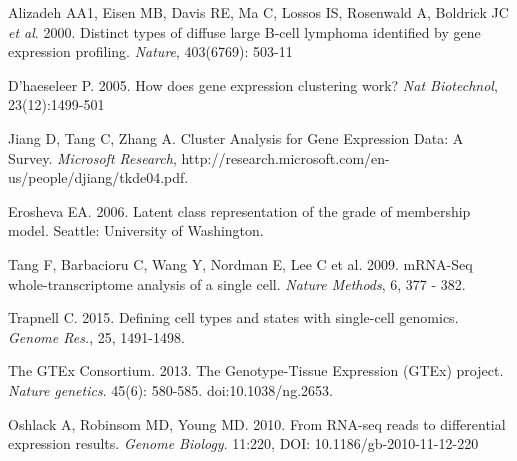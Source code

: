 \documentclass[10pt,letterpaper]{article}
\begin{document}
\begin{thebibliography}{9}
Alizadeh AA1, Eisen MB, Davis RE, Ma C, Lossos IS, Rosenwald A, Boldrick JC \textit{et al}. 2000.
Distinct types of diffuse large B-cell lymphoma identified by gene expression profiling.
\textit{Nature}, 403(6769):  503-11

D'haeseleer P. 2005.
How does gene expression clustering work?
\textit{Nat Biotechnol}, 23(12):1499-501

Jiang D, Tang C, Zhang A.
Cluster Analysis for Gene Expression Data: A Survey.
\textit{Microsoft Research}, http://research.microsoft.com/en-us/people/djiang/tkde04.pdf.

Erosheva EA. 2006.
Latent class representation of the grade of membership model.
Seattle: University of Washington.

Tang F,  Barbacioru C,  Wang Y,  Nordman E,  Lee C  et al. 2009.
mRNA-Seq whole-transcriptome analysis of a single cell.
\textit{Nature Methods}, 6, 377 - 382.

Trapnell C. 2015.
Defining cell types and states with single-cell genomics.
\textit{Genome Res.},  25, 1491-1498.




The GTEx Consortium. 2013.
The Genotype-Tissue Expression (GTEx) project.
\textit{Nature genetics}. 45(6): 580-585. doi:10.1038/ng.2653.

Oshlack A, Robinsom MD, Young MD. 2010.
From RNA-seq reads to differential expression results.
\textit{Genome Biology}. 11:220, DOI: 10.1186/gb-2010-11-12-220


\end{thebibliography}
\end{document}

